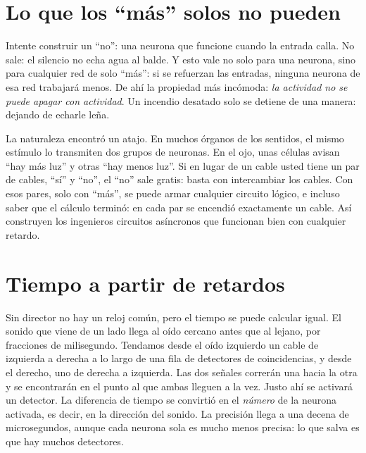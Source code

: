 \section*{Lo que los “más” solos no pueden}

Intente construir un “no”: una neurona que funcione cuando la entrada calla. No sale: el silencio no echa agua al balde. Y esto vale no solo para una neurona, sino para cualquier red de solo “más”: si se refuerzan las entradas, ninguna neurona de esa red trabajará menos. De ahí la propiedad más incómoda: \emph{la actividad no se puede apagar con actividad}. Un incendio desatado solo se detiene de una manera: dejando de echarle leña.

La naturaleza encontró un atajo. En muchos órganos de los sentidos, el mismo estímulo lo transmiten dos grupos de neuronas. En el ojo, unas células avisan “hay más luz” y otras “hay menos luz”. Si en lugar de un cable usted tiene un par de cables, “sí” y “no”, el “no” sale gratis: basta con intercambiar los cables. Con esos pares, solo con “más”, se puede armar cualquier circuito lógico, e incluso saber que el cálculo terminó: en cada par se encendió exactamente un cable. Así construyen los ingenieros circuitos asíncronos que funcionan bien con cualquier retardo.

\section*{Tiempo a partir de retardos}

Sin director no hay un reloj común, pero el tiempo se puede calcular igual. El sonido que viene de un lado llega al oído cercano antes que al lejano, por fracciones de milisegundo. Tendamos desde el oído izquierdo un cable de izquierda a derecha a lo largo de una fila de detectores de coincidencias, y desde el derecho, uno de derecha a izquierda. Las dos señales correrán una hacia la otra y se encontrarán en el punto al que ambas lleguen a la vez. Justo ahí se activará un detector. La diferencia de tiempo se convirtió en el \emph{número} de la neurona activada, es decir, en la dirección del sonido. La precisión llega a una decena de microsegundos, aunque cada neurona sola es mucho menos precisa: lo que salva es que hay muchos detectores.

